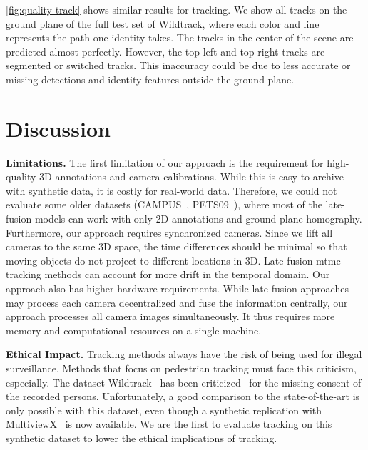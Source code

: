 \documentclass[10pt,twocolumn,letterpaper]{article}
\newcommand{\nparagraph}[1]{\noindent\textbf{#1.  }}
\begin{document}
{\cref{fig:quality-track} shows similar results for tracking. We show all tracks on the ground plane of the full test set of Wildtrack, where each color and line represents the path one identity takes. The tracks in the center of the scene are predicted almost perfectly. However, the top-left and top-right tracks are segmented or switched tracks. This inaccuracy could be due to less accurate or missing detections and identity features outside the ground plane.

 \section{Discussion}

\nparagraph{Limitations} The first limitation of our approach is the requirement for high-quality 3D annotations and camera calibrations. While this is easy to archive with synthetic data, it is costly for real-world data. Therefore, we could not evaluate some older datasets (CAMPUS~\cite{xu2016multi}, PETS09~\cite{ferryman2009pets2009}), where most of the late-fusion models can work with only 2D annotations and ground plane homography.
Furthermore, our approach requires synchronized cameras. Since we lift all cameras to the same 3D space, the time differences should be minimal so that moving objects do not project to different locations in 3D. Late-fusion \gls{mtmc} tracking methods can account for more drift in the temporal domain. Our approach also has higher hardware requirements. While late-fusion approaches may process each camera decentralized and fuse the information centrally, our approach processes all camera images simultaneously. It thus requires more memory and computational resources on a single machine.

\nparagraph{Ethical Impact}Tracking methods always have the risk of being used for illegal surveillance. Methods that focus on pedestrian tracking must face this criticism, especially. The dataset Wildtrack~\cite{chavdarova2018wildtrack} has been criticized~\cite{Exposing.ai} for the missing consent of the recorded persons. Unfortunately, a good comparison to the state-of-the-art is only possible with this dataset, even though a synthetic replication with MultiviewX~\cite{hou2020multiview} is now available. We are the first to evaluate tracking on this synthetic dataset to lower the ethical implications of tracking.

}
\end{document}
